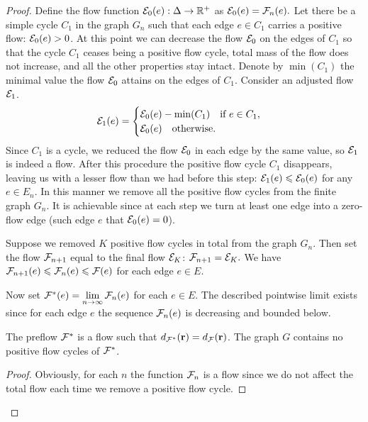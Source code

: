 \documentclass[12pt,oneside,a4paper]{amsart}
\begin{document}
\begin{proof}
        Define the flow function $\cal{E}_0(e): \net \to \mathbb{R}^{+}$ as $\cal{E}_0(e) = \flowposn{n}(e).$
        Let there be a simple cycle $C_1$ in the graph $G_n$ such that each edge $e \in C_1$ carries
          a positive flow: $\cal{E}_0(e) > 0$.
        At this point we can decrease the flow $\cal{E}_0$ on the edges of $C_1$ so that the cycle $C_1$
          ceases being a positive flow cycle, total mass of the flow does not increase, and all the other properties stay intact.
        Denote by $\min(C_1)$ the minimal value the flow $\cal{E}_0$ attains on the edges of $C_1$.
        Consider an adjusted flow $\cal{E}_1$.
        \begin{equation*}
          \cal{E}_1(e) =
          \begin{cases}
            \cal{E}_0(e) - \min(C_1) \quad \text{if } e \in C_1,\\
            \cal{E}_0(e) \quad \text{otherwise}.
          \end{cases}
        \end{equation*}
        Since $C_1$ is a cycle, we reduced the flow $\cal{E}_0$ in each edge by the same value,
          so $\cal{E}_1$ is indeed a flow.
        After this procedure the positive flow cycle $C_1$ disappears,
          leaving us with a lesser flow than we had before this step: $\cal{E}_1(e) \leq \cal{E}_0(e)$ for any $e \in E_n.$
        In this manner we remove all the positive flow cycles from the finite graph $G_n$.
        It is achievable since at each step we turn at least one edge into a zero-flow edge (such edge $e$ that $\cal{E}_0(e) = 0$).

        Suppose we removed $K$ positive flow cycles in total from the graph $G_n$.
        Then set the flow $\flowposn{n+1}$ equal to the final flow $\cal{E}_K$: $\flowposn{n+1} = \cal{E}_K.$
        We have $\flowposn{n+1}(e) \leq \flowposn{n}(e) \leq \flowpos(e)$ for each edge $e \in E$.

        Now set $\preflow(e) = \lim\limits_{n \to \infty} \flowposn{n}(e)$ for each $e \in E$.
        The described pointwise limit exists since for each edge $e$ the sequence $\flowposn{n}(e)$ is decreasing and bounded below.
        \begin{prop}
          The preflow $\preflow$ is a flow such that $d_{\preflow}(\root) = d_{\flowpos}(\root)$.
          The graph $G$ contains no positive flow cycles of $\preflow$.
        \end{prop}
        \begin{proof}
          Obviously, for each $n$ the function $\flowposn{n}$ is a flow since we do not affect the total flow each time we remove a positive flow cycle.


\end{proof}
\end{proof}
\end{document}
